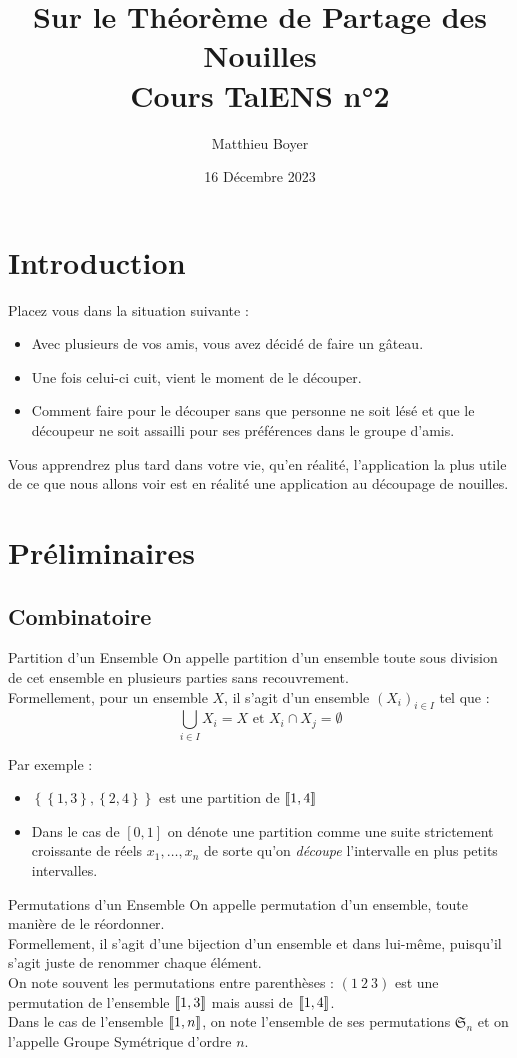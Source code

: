 \documentclass{cours}
\title{Sur le Théorème de Partage des Nouilles\\ \small Cours TalENS n°2}
\author{Matthieu Boyer}
\date{16 Décembre 2023}
\begin{document}
\section*{Introduction}
Placez vous dans la situation suivante\! :
\begin{itemize}
    \item Avec plusieurs de vos amis, vous avez décidé de faire un gâteau.
    \item Une fois celui-ci cuit, vient le moment de le découper.
    \item Comment faire pour le découper sans que personne ne soit lésé et que le découpeur ne soit assailli pour ses préférences dans le groupe d'amis.
\end{itemize}
Vous apprendrez plus tard dans votre vie, qu'en réalité, l'application la plus utile de ce que nous allons voir est en réalité une application au découpage de nouilles.

\section{Préliminaires}
\subsection{Combinatoire}
\begin{définition}{Partition d'un Ensemble}{}
On appelle partition d'un ensemble toute sous division de cet ensemble en plusieurs parties sans recouvrement.\\
Formellement, pour un ensemble $X$, il s'agit d'un ensemble $(X_{i})_{i\in I}$ tel que\! :
\[
    \bigcup_{i\in I}X_{i} = X \text{ et } X_{i} \cap X_{j} = \emptyset
\]
\end{définition}

Par exemple\! :
\begin{itemize}
    \item $\left\{\left\{1, 3\right\}, \left\{2, 4\right\}\right\}$ est une partition de $\left\llbracket 1, 4\right\rrbracket$
    \item Dans le cas de $\left[0, 1\right]$ on dénote une partition comme une suite strictement croissante de réels $x_{1}, \ldots, x_{n}$ de sorte qu'on \textit{découpe} l'intervalle en plus petits intervalles.
\end{itemize}

\begin{définition}{Permutations d'un Ensemble}{}
On appelle permutation d'un ensemble, toute manière de le réordonner.\\
Formellement, il s'agit d'une bijection d'un ensemble et dans lui-même, puisqu'il s'agit juste de renommer chaque élément.\\
On note souvent les permutations entre parenthèses\! : $\left(1 \ 2 \ 3\right)$ est une permutation de l'ensemble $\left\llbracket 1, 3\right\rrbracket$ mais aussi de $\left\llbracket 1, 4\right\rrbracket$.\\
Dans le cas de l'ensemble $\left\llbracket 1, n\right\rrbracket$, on note l'ensemble de ses permutations $\mathfrak{S}_{n}$ et on l'appelle Groupe Symétrique d'ordre $n$.
\end{définition}
\end{document}
